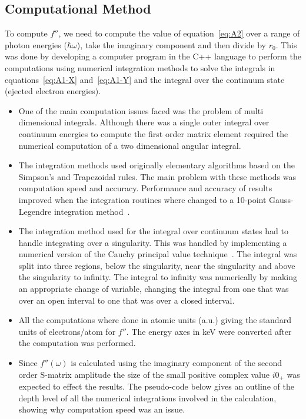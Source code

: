 \subsection{Computational Method}
To compute $f''$, we need to compute the value of equation~\ref{eq:A2} 
over a range of photon energies ($\hbar \omega$), 
take the imaginary component and then divide by $r_0$.
This was done by developing a computer program in the C++ language to perform 
the computations using
numerical integration methods to solve the integrals in equations~\ref{eq:A1-X}
and~\ref{eq:A1-Y} and the integral over the continuum state (ejected electron
energies).
\begin{itemize}
    \item One of the main computation issues faced was the problem of multi 
          dimensional integrals. Although there was a single outer integral
          over continuum energies to compute the first order matrix element
          required the numerical computation of a two dimensional angular integral.
    \item The integration methods used originally elementary algorithms 
          based on the Simpson's and Trapezoidal rules. The main problem with
          these methods was computation speed and accuracy.
          Performance and accuracy of results improved when the integration
          routines where changed to a 10-point Gauss-Legendre 
          integration method~\cite{Koonin}.
    \item The integration method used for the integral over continuum states
          had to handle integrating over a singularity. This was handled by
          implementing a numerical version of the Cauchy principal value
          technique~\cite{Engineering-Maths}. The integral was split into 
          three regions, below the singularity, near the singularity and
          above the singularity to infinity. The integral to infinity was
          numerically by making an appropriate change of variable, changing
          the integral from one that was over an open interval to one that
          was over a closed interval.
    \item All the computations where done in atomic units (a.u.) 
          giving the standard units of electrons/atom for $f''$.
          The energy axes in keV were converted after the computation
          was performed.
    \item Since $f''(\omega)$ is calculated using the imaginary component
          of the second order S-matrix amplitude the size of the small
          positive complex value $i0_+$ was expected to effect the results.
The pseudo-code below gives an outline of the depth level of all the
numerical integrations involved in the calculation, showing why computation
speed was an issue.
\end{itemize}
